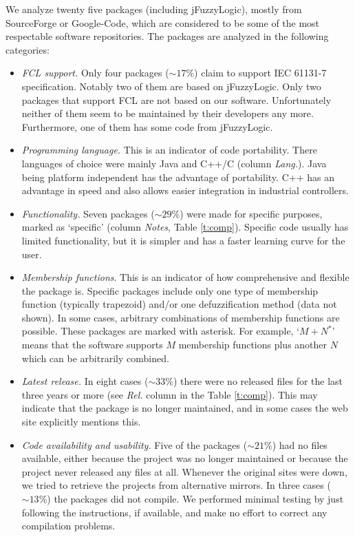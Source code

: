 \documentclass[11pt,twoside]{article}
\begin{document}
\begin{multicols}{2}
We analyze twenty five packages (including jFuzzyLogic), mostly from SourceForge or Google-Code, which are considered to be some of the most respectable software repositories.
The packages are analyzed in the following categories:

\begin{itemize}
	\item \textit{FCL support.} Only four packages ($\sim 17\%$) claim to support IEC 61131-7 specification. 
	Notably two of them are based on jFuzzyLogic. 
	Only two packages that support FCL are not based on our software. Unfortunately neither of them seem to be maintained by their developers any more. 
	Furthermore, one of them has some code from jFuzzyLogic.

	\item \textit{Programming language.} This is an indicator of code portability. 
	There languages of choice were mainly Java and C++/C (column \textit{Lang.}). 
	Java being platform independent has the advantage of portability. 
	C++ has an advantage in speed and also allows easier integration in industrial controllers.
	
	\item \textit{Functionality.} Seven packages ($\sim 29\%$) were made for specific purposes, marked as `specific' (column \textit{Notes}, Table \ref{t:comp}).
	Specific code usually has limited functionality, but it is simpler and has a faster learning curve for the user.

	\item \textit{Membership functions}. This is an indicator of how comprehensive and flexible the package is. 
	Specific packages include only one type of membership function (typically trapezoid) and/or one defuzzification method (data not shown).
	In some cases, arbitrary combinations of membership functions are possible. 
	These packages are marked with asterisk. 
	For example, `$M+N^*$' means that the software supports $M$ membership functions plus another $N$ which can be arbitrarily combined.
	
	\item \textit{Latest release.} In eight cases ($\sim 33\%$) there were no released files for the last three years or more (see \textit{Rel.} column in the Table \ref{t:comp}).
	This may indicate that the package is no longer maintained, and in some cases the web site explicitly mentions this.

	\item \textit{Code availability and usability.} Five of the packages ($\sim 21\%$) had no files available, either because the project was no longer maintained or because the project never released any files at all. 
	Whenever the original sites were down, we tried to retrieve the projects from alternative mirrors.
	In three cases ($\sim 13\%$) the packages did not compile. 
	We performed minimal testing by just following the instructions, if available, and make no effort to correct any compilation problems. 
\end{itemize}


\end{multicols}
\end{document}
